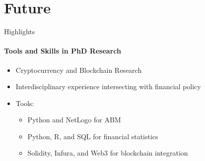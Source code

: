 \documentclass{beamer}
\begin{document}
\section{Future}

\begin{frame}{Highlights}
\framesubtitle{Tools and Skills in PhD Research}

\begin{itemize}
\item Cryptocurrency and Blockchain Research
\item Interdisciplinary experience intersecting with financial policy
\item Tools: 
\begin{itemize}
    \item Python and NetLogo for ABM
    \item Python, R, and SQL for financial statistics
    \item Solidity, Infura, and Web3 for blockchain integration
\end{itemize}
\end{itemize}
\end{frame}
\end{document}
